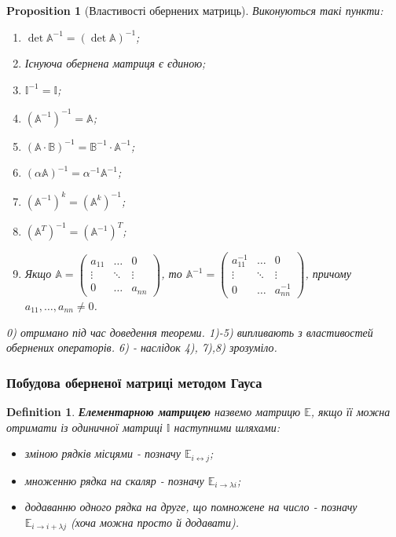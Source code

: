 \documentclass[a4paper, 10pt]{article}
\theoremstyle{theoremdd}
\newtheorem{definition}[theorem]{Definition}
\newtheorem{proposition}[theorem]{Proposition}
\begin{document}
\begin{proposition}[Властивості обернених матриць]
	Виконуються такі пункти:
	\begin{enumerate}[nosep,wide=0pt,label={\arabic*)},start=0]
	\item $\det \mathbb{A}^{-1} = (\det \mathbb{A})^{-1}$;
	\item Існуюча обернена матриця є єдиною;
	\item $\mathbb{I}^{-1} = \mathbb{I}$;
	\item $(\mathbb{A}^{-1})^{-1} = \mathbb{A}$;
	\item $(\mathbb{A} \cdot \mathbb{B})^{-1} = \mathbb{B}^{-1} \cdot \mathbb{A}^{-1}$;
	\item $(\alpha \mathbb{A})^{-1} = \alpha^{-1} \mathbb{A}^{-1}$;
	\item $(\mathbb{A}^{-1})^k = (\mathbb{A}^k)^{-1}$;
	\item $(\mathbb{A}^T)^{-1} = (\mathbb{A}^{-1})^T$;
	\item Якщо $\mathbb{A} = \begin{pmatrix}
	a_{11} & \dots & 0 \\
	\vdots & \ddots & \vdots \\
	0 & \dots & a_{nn}
	\end{pmatrix}$, то $\mathbb{A}^{-1} = \begin{pmatrix}
	a_{11}^{-1} & \dots & 0 \\
	\vdots & \ddots & \vdots \\
	0 & \dots & a_{nn}^{-1}
	\end{pmatrix}$, причому $a_{11},\dots,a_{nn} \neq 0$.
	\end{enumerate}
\textit{0) отримано під час доведення теореми. 1)-5) випливають з властивостей обернених операторів. 6) - наслідок 4), 7),8) зрозуміло.}
\end{proposition}

\subsubsection*{Побудова оберненої матриці методом Гауса}
\begin{definition}
\textbf{Елементарною матрицею} назвемо матрицю $\mathbb{E}$, якщо її можна отримати із одиничної матриці $\mathbb{I}$ наступними шляхами:
\begin{itemize}[label={-}, nosep, wide=0pt]
\item зміною рядків місцями - позначу $\mathbb{E}_{i \leftrightarrow j}$;
\item множенню рядка на скаляр - позначу $\mathbb{E}_{i \rightarrow \lambda i}$;
\item додаванню одного рядка на друге, що помножене на число - позначу $\mathbb{E}_{i \rightarrow i + \lambda j}$ (хоча можна просто й додавати).
\end{itemize}
\end{definition}
\end{document}
